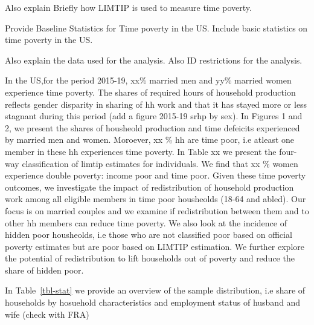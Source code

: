 \documentclass[
  11pt,
]{article}
\begin{document}
Also explain Briefly how LIMTIP is used to measure time poverty.

Provide Baseline Statistics for Time poverty in the US. Include basic
statistics on time poverty in the US.

Also explain the data used for the analysis. Also ID restrictions for
the analysis.

In the US,for the period 2015-19, xx\% married men and yy\% married
women experience time poverty. The shares of required hours of household
production reflects gender disparity in sharing of hh work and that it
has stayed more or less stagnant during this period (add a figure
2015-19 srhp by sex). In Figures 1 and 2, we present the shares of
housheold production and time defeicits experienced by married men and
women. Moroever, xx \% hh are time poor, i.e atleast one member in these
hh experiences time poverty. In Table xx we present the four-way
classification of limtip estimates for individuals. We find that xx \%
women experience double poverty: income poor and time poor. Given these
time poverty outcomes, we investigate the impact of redistribution of
household production work among all eligible members in time poor
housheolds (18-64 and abled). Our focus is on married couples and we
examine if redistribution between them and to other hh members can
reduce time poverty. We also look at the incidence of hidden poor
housheolds, i.e those who are not classified poor based on official
poverty estimates but are poor based on LIMTIP estimation. We further
explore the potential of redistribution to lift households out of
poverty and reduce the share of hidden poor.

In Table~\ref{tbl-stat} we provide an overview of the sample
distribution, i.e share of households by hosuehold characteristics and
employment status of husband and wife (check with FRA)
\end{document}
